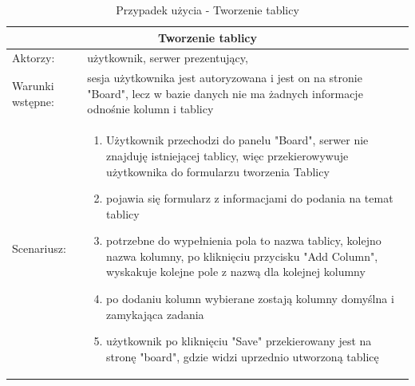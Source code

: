 \begin{table}[h!]
\begin{tabular}{ |p{2cm}||p{13cm}|  }

\hline
\multicolumn{2}{|c|}{Tworzenie tablicy} \\
\hline
Aktorzy: &użytkownik, serwer prezentujący,\\
\hline
Warunki wstępne: &sesja użytkownika jest autoryzowana i jest on na stronie "Board", lecz w bazie danych nie ma żadnych informacje odnośnie kolumn i tablicy\\
\hline
Scenariusz: &

\begin{enumerate}
	\item Użytkownik przechodzi do panelu "Board", serwer nie znajduję istniejącej tablicy, więc przekierowywuje użytkownika do formularzu tworzenia Tablicy
	\item pojawia się formularz z informacjami do podania na temat tablicy
	\item potrzebne do wypełnienia pola to nazwa tablicy, kolejno nazwa kolumny, po kliknięciu przycisku "Add Column", wyskakuje kolejne pole z nazwą dla kolejnej kolumny
	\item po dodaniu kolumn wybierane zostają kolumny domyślna i zamykająca zadania
	\item użytkownik po kliknięciu "Save" przekierowany jest na stronę "board", gdzie widzi uprzednio utworzoną tablicę
\end{enumerate}\\
\hline
\end{tabular}
\caption{Przypadek użycia -  Tworzenie tablicy}
\end{table}


